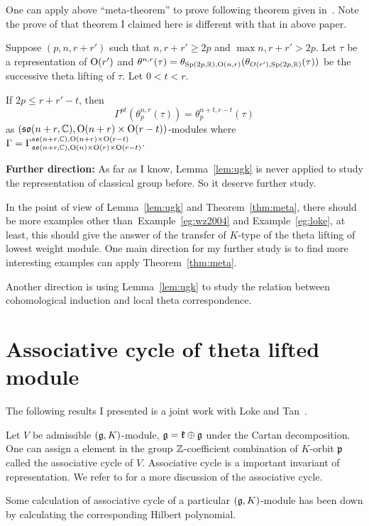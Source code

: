 \documentclass{amsart}
\begin{document}
One can apply above ``meta-theorem'' to prove following theorem given in~\cite{LokeMaTang2011}. 
Note the prove of that theorem I claimed here is different with that in above paper.
\begin{eg} \label{eg:loke} Suppose
  $(p,n, r + r')$ such that $n,r+r'\geq2p$ and $\max{n,r+r'}> 2p$.
  Let $\tau$ be a representation of ${\rm O}(r')$ and $\theta^{n,r}(\tau) =
  \theta_{{\rm Sp}(2p,{\mathbb{R}}),{\rm O}(n,r)}(\theta_{O(r'),{\rm Sp}(2p,{\mathbb{R}})}(\tau))$ be
  the successive theta lifting of $\tau$. Let $0 < t< r$.

  If $2p \leq r+r'-t$, then
\[
\Gamma^{pt}(\theta_p^{n,r}(\tau)) =
  \theta_p^{n+t,r-t}(\tau)
\]
as $(\mathfrak{so}(n+r,{\mathbb{C}}), {\rm O}(n+r)\times{\rm O}(r-t))$-modules where $\Gamma = \Gamma_{\mathfrak{so}(n+r,{\mathbb{C}}),{\rm O}(n)\times {\rm O}(r)\times {\rm O}(r-t)}^{\mathfrak{so}(n+r,{\mathbb{C}}),{\rm O}(n+r)\times {\rm O}(r-t)}$.
\end{eg}

{\bf Further direction:}
As far as I know, Lemma~\ref{lem:ugk} is never applied to study the representation of classical group before. So it deserve further study.  

In the point of view of Lemma~\ref{lem:ugk} and
Theorem~\ref{thm:meta}, there should be more examples other
than~Example~\ref{eg:wz2004} and Example~\ref{eg:loke}, at least, this
should give the answer of the transfer of $K$-type of the theta
lifting of lowest weight module. One main direction for my further
study is to find more interesting examples can apply
Theorem~\ref{thm:meta}.

Another direction is using Lemma~\ref{lem:ugk} to study the relation between 
cohomological induction and local theta correspondence. 


\section{Associative cycle of theta lifted module}
The following results I presented is a joint work with Loke and Tan~\cite{lokematan2011b}.

Let $V$ be admissible $(\mathfrak{g},K)$-module, $\mathfrak{g} = \mathfrak{k}\oplus \mathfrak{g}$
under the Cartan decomposition.  One can assign a element in the group
${\mathbb{Z}}$-coefficient combination of $K$-orbit $\mathfrak{p}$ called the
associative cycle of $V$. Associative cycle is a important invariant
of representation.  We refer to \cite{Vogan1989Var} for a more
discussion of the associative cycle.

Some calculation of associative cycle of a particular $(\mathfrak{g},K)$-module
has been down by calculating the corresponding Hilbert polynomial.
\end{document}
